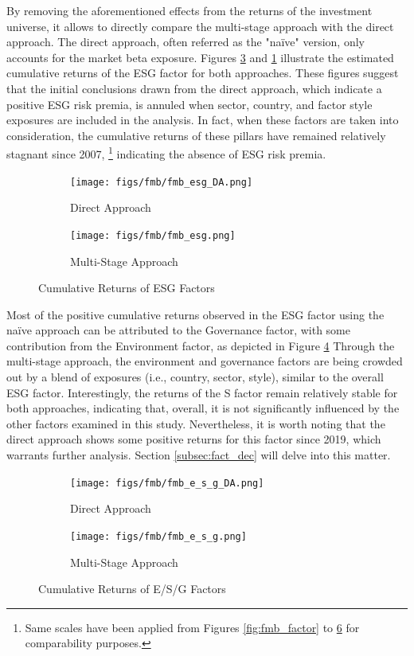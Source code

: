 \documentclass[11pt,a4paper]{article}
\begin{document}
By removing the aforementioned effects from the returns of the investment universe, it allows to directly compare the multi-stage approach with the direct approach. 
The direct approach, often referred as the "naïve" version, only accounts for the market beta exposure.
Figures \ref{fig:fmb_esg} and \ref{fig:fmb_esg_DA} illustrate the estimated cumulative returns of the ESG factor for both approaches. 
These figures suggest that the initial conclusions drawn from the direct approach, which indicate a positive ESG risk premia, is annuled when sector, country, and factor style exposures are included in the analysis.
In fact, when these factors are taken into consideration, the cumulative returns of these pillars have remained relatively stagnant since 2007, \footnote{Same scales have been applied from Figures \ref{fig:fmb_factor} to \ref{fig:fmb_e_s_g} for comparability purposes.} indicating the absence of ESG risk premia. 

\begin{figure}[h!]
    \centering
    \begin{subfigure}{.5\textwidth}
        \centering
        \texttt{[image: figs/fmb/fmb\_esg\_DA.png]}
        \caption{Direct Approach}
        \label{fig:fmb_esg_DA}
    \end{subfigure}%
    \begin{subfigure}{.5\textwidth}
      \centering
      \texttt{[image: figs/fmb/fmb\_esg.png]}
      \caption{Multi-Stage Approach}
      \label{fig:fmb_esg}
    \end{subfigure}
    \caption{Cumulative Returns of ESG Factors}
\end{figure}

Most of the positive cumulative returns observed in the ESG factor using the naïve approach can be attributed to the Governance factor, with some contribution from the Environment factor, as depicted in Figure \ref{fig:fmb_e_s_g_DA}
Through the multi-stage approach, the environment and governance factors are being crowded out by a blend of exposures (i.e., country, sector, style), similar to the overall ESG factor. 
Interestingly, the returns of the S factor remain relatively stable for both approaches, indicating that, overall, it is not significantly influenced by the other factors examined in this study. 
Nevertheless, it is worth noting that the direct approach shows some positive returns for this factor since 2019, which warrants further analysis. 
Section \ref{subsec:fact_dec} will delve into this matter.

\begin{figure}[h!]
    \centering
    \begin{subfigure}{.5\textwidth}
        \centering
        \texttt{[image: figs/fmb/fmb\_e\_s\_g\_DA.png]}
        \caption{Direct Approach}
        \label{fig:fmb_e_s_g_DA}
    \end{subfigure}%
    \begin{subfigure}{.5\textwidth}
      \centering
      \texttt{[image: figs/fmb/fmb\_e\_s\_g.png]}
      \caption{Multi-Stage Approach}
      \label{fig:fmb_e_s_g}
    \end{subfigure}
    \caption{Cumulative Returns of E/S/G Factors}
\end{figure}
\end{document}
